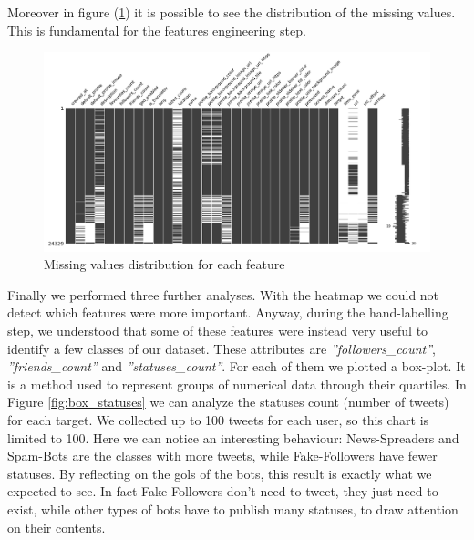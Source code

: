 Moreover in figure (\ref{fig:msno}) it is possible to see the distribution of the missing values. This is fundamental for the features engineering step.

\begin{figure}
	\centering
	\includegraphics[width=\columnwidth]{chapter3/figure/msno.png}
	\caption{Missing values distribution for each feature}
	\label{fig:msno}
\end{figure}

\newpage
Finally we performed three further analyses. With the heatmap we could not detect which features were more important. Anyway, during the hand-labelling step, we understood that some of these features were instead very useful to identify a few classes of our dataset. These attributes are \emph{''followers\_count''}, \emph{''friends\_count''} and \emph{''statuses\_count''}. For each of them we plotted a box-plot. It is a method used to represent groups of numerical data through their quartiles. In Figure \ref{fig:box_statuses} we can analyze the statuses count (number of tweets) for each target. We collected up to 100 tweets for each user, so this chart is limited to 100. Here we can notice an interesting behaviour: News-Spreaders and Spam-Bots are the classes with more tweets, while Fake-Followers have fewer statuses. By reflecting on the gols of the bots, this result is exactly what we expected to see. In fact Fake-Followers don't need to tweet, they just need to exist, while other types of bots have to publish many statuses, to draw attention on their contents.

